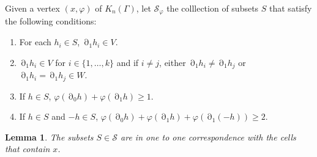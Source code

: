 \documentclass{article}
\DeclareMathOperator{\bnd}{\partial}
\newtheorem{lemma}{Lemma}
\begin{document}
Given a vertex $(x,\varphi)$ of $K_n(\mathsf{\Gamma})$, let $\mathcal{S_{\varphi}}$ the colllection of subsets $S$ that satisfy the following conditions:
    
      \begin{enumerate}
        \item For each $h_i\in S$, $\bnd_1 h_i\in V$.
        \item $\bnd_1 h_i\in V$ for $i\in \{1, \dots, k\}$ and if $i\neq j$, either $\bnd_1 h_i\neq \bnd_1 h_j$ or $\bnd_1 h_i=\bnd_1 h_j\in W$.
        \item If $h\in S$, $\varphi(\bnd_0h)+\varphi(\bnd_1h)\geq 1$.
        \item   If $h\in S$ and $-h\in S$, $\varphi(\bnd_0 h)+\varphi(\bnd_1 h)+\varphi(\bnd_1(-h))\geq 2$. \end{enumerate}
\begin{lemma}\label{lemma}
   The subsets $S\in \mathcal{S}$
    are in one to one correspondence with the cells that contain $x$.
\end{lemma}
\end{document}
